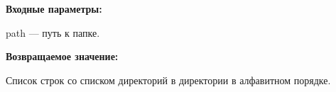 \textbf{Входные параметры:}

path --- путь к папке.

\textbf{Возвращаемое значение:}

Список строк со списком директорий в директории в алфавитном порядке.